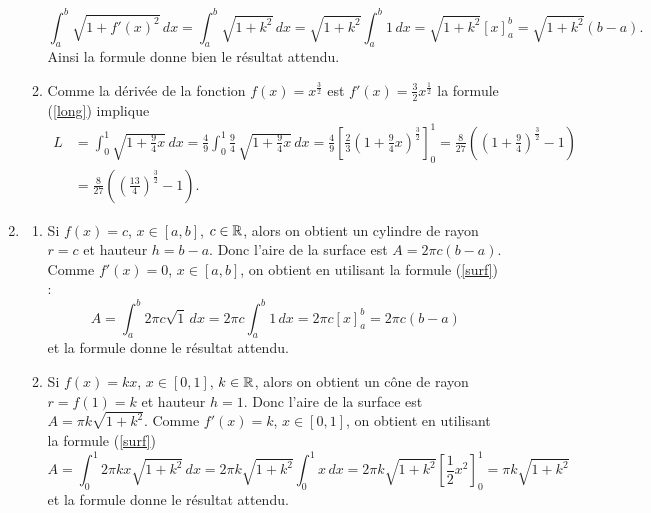\documentclass[11pt,class=report,crop=false]{standalone}
\begin{document}
\begin{enumerate}
\begin{enumerate}
		\begin{equation*} 
			\int_{a}^{b} \sqrt{1+f'(x)^{2}}\,dx = \int_a^b \sqrt{1 + k^2} \, dx 
			= \sqrt{1 + k^2} \int_a^b 1 \, dx
			= \sqrt{1 + k^2} \left[x\right]_a^b 
			= \sqrt{1 + k^2} (b - a). 
		\end{equation*} 
		Ainsi la formule donne bien le résultat attendu. 
		\item 
		Comme la dérivée de la fonction $ f(x) = x^{\frac{3}{2}} $ est $ f'(x) = 
		\frac{3}{2} x^{\frac{1}{2}} $ la formule (\ref{long}) implique 
		\begin{equation*} 
			\begin{split} 
				L &= \int_0^1 \sqrt{1 + \tfrac{9}{4} x} \, dx 
				= \frac{4}{9} \int_0^1 \frac{9}{4} \, \sqrt{1 + \tfrac{9}{4} x} \, dx 
				= \frac{4}{9} \left[\frac{2}{3} \left(1 + \frac{9}{4} x\right)^{\frac{3}{2}}\right]_0^1 
				= \frac{8}{27} \left(\left(1 + \frac{9}{4}\right)^{\frac{3}{2}} - 1\right) \\ 
				&= \frac{8}{27} \left(\left(\frac{13}{4}\right)^{\frac{3}{2}} - 1\right). 
			\end{split} 
		\end{equation*} 
	\end{enumerate} 
	\item 
	\begin{enumerate} 
		\item 
		Si $ f(x) = c $, $ x \in [a, b] $, $ c \in \mathbb{R} $, alors on obtient un 
		cylindre de rayon $ r = c $ et hauteur $ h = b - a $. Donc l'aire de la 
		surface est $ A = 2 \pi c (b-a) $. Comme $ f'(x) = 0 $, $ x \in [a, b] $, 
		on obtient en utilisant la formule (\ref{surf}) :
		\begin{equation*} 
			A = \int_a ^b 2\pi c \sqrt {1}\,dx 
			= 2\pi c \int_a^b 1 \, dx = 2\pi c \left[x\right]_a^b = 2\pi c (b-a) 
		\end{equation*} 
		et la formule donne le résultat attendu. 
		\item 
		Si $ f(x) = kx $, $ x \in [0, 1] $, $ k \in \mathbb{R} $, alors on obtient un 
		c\^one de rayon $ r = f(1) = k $ et hauteur $ h = 1 $. Donc l'aire de 
		la surface est $ A = \pi k \sqrt{1 + k^2} $. Comme $ f'(x) = k $, $ x 
		\in [0, 1] $, on obtient en utilisant la formule (\ref{surf}) 
		\begin{equation*} 
			A = \int_0^1 2 \pi kx \sqrt{1 + k^2}\,dx 
			= 2 \pi k \sqrt{1 + k^2} \int_0^1 x \, dx 
			= 2 \pi k \sqrt{1 + k^2} \left[\frac{1}{2} x^2\right]_0^1 
			= \pi k \sqrt{1 + k^2} 
		\end{equation*} 
		et la formule donne le résultat attendu. 

\end{enumerate}
\end{enumerate}
\end{document}
